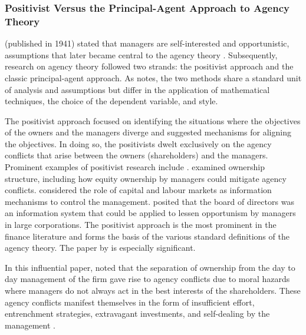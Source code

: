 \documentclass[a4paper,nobind]{templates/ociamthesis}
\begin{document}
\hypertarget{positivist-versus-the-principal-agent-approach-to-agency-theory}{%
\subsubsection{Positivist Versus the Principal-Agent Approach to Agency Theory}\label{positivist-versus-the-principal-agent-approach-to-agency-theory}}

\textcite{genoe2011james} (published in 1941) stated that managers are self-interested and opportunistic, assumptions that later became central to the agency theory \autocite{bendickson2016agency}. Subsequently, research on agency theory followed two strands: the positivist approach and the classic principal-agent approach. As \textcite{eisenhardt1989agency} notes, the two methods share a standard unit of analysis and assumptions but differ in the application of mathematical techniques, the choice of the dependent variable, and style.

The positivist approach focused on identifying the situations where the objectives of the owners and the managers diverge and suggested mechanisms for aligning the objectives. In doing so, the positivists dwelt exclusively on the agency conflicts that arise between the owners (shareholders) and the managers. Prominent examples of positivist research include \autocite{jensen1976theory,fama1980agency,jensen1983organization}. \textcite{jensen1976theory} examined ownership structure, including how equity ownership by managers could mitigate agency conflicts. \textcite{fama1980agency} considered the role of capital and labour markets as information mechanisms to control the management. \textcite{fama1983agency} posited that the board of directors was an information system that could be applied to lessen opportunism by managers in large corporations. The positivist approach is the most prominent in the finance literature and forms the basis of the various standard definitions of the agency theory. The paper by \textcite{jensen1976theory} is especially significant.

In this influential paper, \textcite{jensen1976theory} noted that the separation of ownership from the day to day management of the firm gave rise to agency conflicts due to moral hazards where managers do not always act in the best interests of the shareholders. These agency conflicts manifest themselves in the form of insufficient effort, entrenchment strategies, extravagant investments, and self-dealing by the management \autocite{tirole2010theory}.
\end{document}
